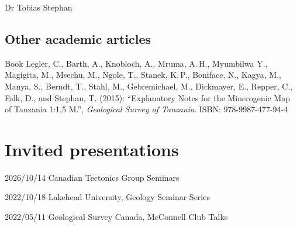 \documentclass[10pt, paper=letter]{scrartcl} %
\begin{document}
\begin{cv}{\textcolor{myred}{\textsf{Dr Tobias Stephan}}}
    \subsection{Other academic articles}
    \begin{cvlist}{}
        \item[Book] Legler, C., Barth, A., Knobloch, A., Mruma, A.\,H., Myumbilwa Y.,
        Magigita, M., Msechu, M., Ngole, T., Stanek, K.\,P., Boniface, N., Kagya, M.,
        Manya, S., Berndt, T., Stahl, M., Gebremichael, M., Dickmayer, E., Repper, C.,
        Falk, D., and Stephan, T. (2015): \enquote{Explanatory Notes for the
            Minerogenic Map of Tanzania 1:1,5 M.}, \textit{Geological Survey of Tanzania}.
        ISBN: 978-9987-477-94-4
    \end{cvlist}

    \section{Invited presentations}
    \begin{cvlist}{}
        \item[2026/10/14]{Canadian Tectonics Group Seminars}
        \item[2022/10/18]{Lakehead University, Geology Seminar Series}
        \item[2022/05/11]{Geological Survey Canada, McConnell Club Talks}
    \end{cvlist}


\end{cv}
\end{document}

